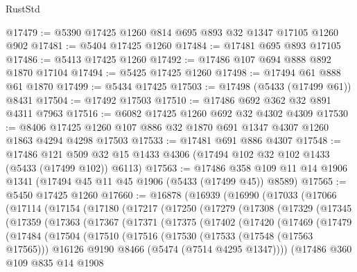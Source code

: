 \begin{lexlean}{RustStd}
\begin{coremodule}
@17479 := @5390 @17425 @1260 @814 @695 @893 @32 @1347 @17105 @1260 @902
@17481 := @5404 @17425 @1260
@17484 := @17481 @695 @893 @17105
@17486 := @5413 @17425 @1260
@17492 := @17486 @107 @694 @888 @892 @1870 @17104
@17494 := @5425 @17425 @1260
@17498 := @17494 @61 @888 @61 @1870
@17499 := @5434 @17425
@17503 := @17498 (@5433 (@17499 @61)) @8431
@17504 := @17492 @17503
@17510 := @17486 @692 @362 @32 @891 @4311 @7963
@17516 := @6082 @17425 @1260 @692 @32 @4302 @4309
@17530 := @8406 @17425 @1260 @107 @886 @32 @1870 @691 @1347 @4307 @1260 @1863 @4294 @4298 @17503
@17533 := @17481 @691 @886 @4307
@17548 := @17486
    @121
    @509
    @32
    @15
    @1433
    @4306
    (@17494 @102 @32 @102 @1433 (@5433 (@17499 @102)) @6113)
@17563 := @17486 @358 @109 @11 @14 @1906 @1341 (@17494 @45 @11 @45 @1906 (@5433 (@17499 @45)) @8589)
@17565 := @5450 @17425 @1260
@17660 := @16878
    (@16939
      (@16990
        (@17033
          (@17066
            (@17114
              (@17154
                (@17180
                  (@17217
                    (@17250
                      (@17279
                        (@17308
                          (@17329
                            (@17345
                              (@17359
                                (@17363
                                  (@17367
                                    (@17371
                                      (@17375
                                        (@17402
                                          (@17420
                                            (@17469
                                              (@17479
                                                (@17484
                                                  (@17504
                                                    (@17510
                                                      (@17516
                                                        (@17530
                                                          (@17533 (@17548 (@17563 @17565)))
                                                          @16126
                                                          @9190
                                                          @8466
                                                          (@5474 (@7514 @4295 @1347))))
                                                      (@17486
                                                        @360
                                                        @109
                                                        @835
                                                        @14
                                                        @1908

\end{coremodule}
\end{lexlean}
